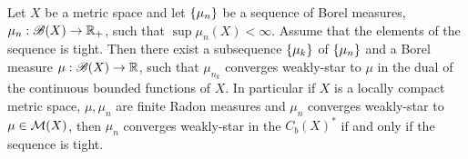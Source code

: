 \begin{theorem}[Prohorov]
	Let $X$ be a metric space and let $\left\lbrace \mu_n \right\rbrace$ be a sequence of Borel measures, $\mu_n:\mathscr{B}(X)\rightarrow 
	\mathbb{R}_+$, such that $\sup\mu_n(X)<\infty$. Assume that the elements of the sequence is tight. Then there exist a subsequence $\left\lbrace \mu_k \right\rbrace$ of $\left\lbrace \mu_n \right\rbrace$ and a Borel measure $\mu:\mathscr{B}(X)\rightarrow \mathbb{R}$, such that $\mu_{n_k}$ converges weakly-star to $\mu$ in the dual of the continuous bounded functions of $X$. In particular if $X$ is a locally compact metric space, $\mu, \mu_n$ are finite Radon measures and $\mu_n$ converges weakly-star to $\mu\in \mathcal{M}(X)$, then $\mu_n$ converges weakly-star in the $C_b(X)^*$ if and only if the sequence is tight.
\end{theorem}
